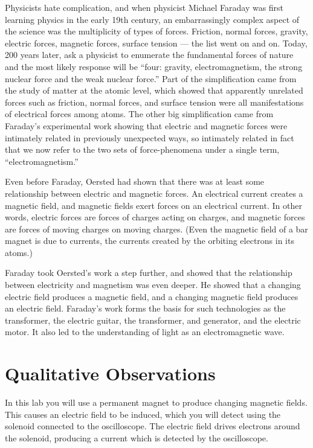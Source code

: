 Physicists hate complication, and when physicist Mich\-ael
Faraday was first learning physics in the early 19th
century, an embarrassingly complex aspect of the science was
the multiplicity of types of forces. Friction, normal
forces, gravity, electric forces, magnetic forces, surface
tension --- the list went on and on. Today, 200 years later,
ask a physicist to enumerate the fundamental forces of
nature and the most likely response will be ``four: gravity,
electromagnetism, the strong nuclear force and the weak
nuclear force.'' Part of the simplification came from the
study of matter at the atomic level, which showed that
apparently unrelated forces such as friction, normal forces,
and surface tension were all manifestations of electrical
forces among atoms. The other big simplification came from
Faraday's experimental work showing that electric and
magnetic forces were intimately related in previously
unexpected ways, so intimately related in fact that we now
refer to the two sets of force-phenomena under a single
term, ``electromagnetism.''

Even before Faraday, Oersted had shown that there was at
least some relationship between electric and magnetic
forces. An electrical current creates a magnetic field, and
magnetic fields exert forces on an electrical current. In
other words, electric forces are forces of charges acting on
charges, and magnetic forces are forces of moving charges on
moving charges. (Even the magnetic field of a bar magnet is
due to currents, the currents created by the orbiting
electrons in its atoms.)

Faraday took Oersted's work a step further, and showed that
the relationship between electricity and magnetism was even
deeper. He showed that a changing electric field produces a
magnetic field, and a changing magnetic field produces an
electric field. Faraday's work forms the basis for such
technologies as the transformer, the electric guitar, the
transformer, and generator, and the electric motor. It also
led to the understanding of light as an electromagnetic wave.

\section{Qualitative Observations}

In this lab you will use a permanent magnet to produce
changing magnetic fields. This causes an electric field to
be induced, which you will detect using the solenoid connected to the oscilloscope. The electric field
drives electrons around the solenoid, producing a current
which is detected by the oscilloscope.

